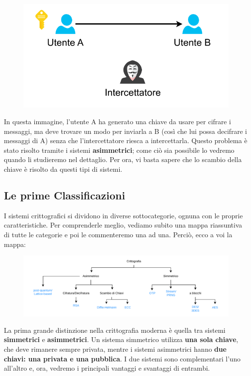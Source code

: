\documentclass{report}
\begin{document}
\begin{figure}[h]
    \centering
    \includegraphics[width=0.6\linewidth]{logos/critpo5pdf.pdf}
\end{figure}

In questa immagine, l’utente A ha generato una chiave da usare per cifrare i messaggi, ma deve trovare un modo per inviarla a B (così che lui possa decifrare i messaggi di A) senza che l’intercettatore riesca a intercettarla. Questo problema è stato risolto tramite i sistemi \textbf{asimmetrici}; come ciò sia possibile lo vedremo quando li studieremo nel dettaglio. Per ora, vi basta sapere che lo scambio della chiave è risolto da questi tipi di sistemi.



\subsection{Le prime Classificazioni}

I sistemi crittografici si dividono in diverse sottocategorie, ognuna con le proprie caratteristiche. Per comprenderle meglio, vediamo subito una mappa riassuntiva di tutte le categorie e poi le commenteremo una ad una. Perciò, ecco a voi la mappa:

\begin{figure}[h]
    \centering
    \includegraphics[width=\linewidth]{logos/cripto4.pdf}
\end{figure}





La prima grande distinzione nella crittografia moderna è quella tra sistemi \textbf{simmetrici} e \textbf{asimmetrici}. Un sistema simmetrico utilizza \textbf{una sola chiave}, che deve rimanere sempre privata, mentre i sistemi asimmetrici hanno \textbf{due chiavi: una privata e una pubblica}. I due sistemi sono complementari l’uno all’altro e, ora, vedremo i principali vantaggi e svantaggi di entrambi.
\end{document}
